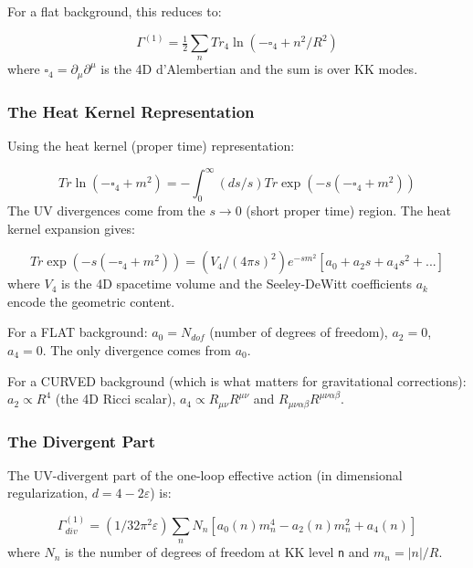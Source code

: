 \documentclass[aps,prd,preprint,superscriptaddress,longbibliography,floatfix]{revtex4-2}
\theoremstyle{remark}
\begin{document}
For a flat background, this reduces to:


\begin{equation}
    \Gamma^{(1)} = \tfrac{1}{2} \sum_n Tr_{4} \ln(-\square_{4} + n^{2}/R^{2})
\end{equation}
where $\square_{4} = \partial_\mu\partial^\mu$ is the 4D d'Alembertian and the sum is over KK modes.


\subsubsection{The Heat Kernel Representation}

Using the heat kernel (proper time) representation:


\begin{equation}
    Tr \ln(-\square_{4} + m^{2}) = -\int_0^\infty (ds/s) Tr \exp(-s(-\square_{4} + m^{2}))
\end{equation}
The UV divergences come from the $s \to 0$ (short proper time) region. The heat kernel expansion gives:


\begin{equation}
    Tr \exp(-s(-\square_{4} + m^{2})) = (V_{4}/(4\pi s)^{2}) e^{-sm^{2}} [a_{0} + a_{2} s + a_{4} s^{2} + ...]
\end{equation}
where $V_{4}$ is the 4D spacetime volume and the Seeley-DeWitt coefficients $a_{k}$ encode the geometric content.

For a FLAT background: $a_{0} = N_{dof}$ (number of degrees of freedom), $a_{2} = 0$, $a_{4} = 0$. The only divergence comes from $a_{0}$.

For a CURVED background (which is what matters for gravitational corrections): $a_{2} \propto R^{4}$ (the 4D Ricci scalar), $a_{4} \propto R_{\mu\nu}R^{\mu\nu}$ and $R_{\mu\nu\alpha\beta}R^{\mu\nu\alpha\beta}$.


\subsubsection{The Divergent Part}

The UV-divergent part of the one-loop effective action (in dimensional regularization, $d = 4 - 2\varepsilon$) is:


\begin{equation}
    \Gamma^{(1)}_{div} = (1/32\pi^{2}\varepsilon) \sum_n N_n [a_{0}(n) m_n^{4} - a_{2}(n) m_n^{2} + a_{4}(n)]
\end{equation}
where $N_n$ is the number of degrees of freedom at KK level \texttt{n} and $m_{n} = |n|/R$.
\end{document}
